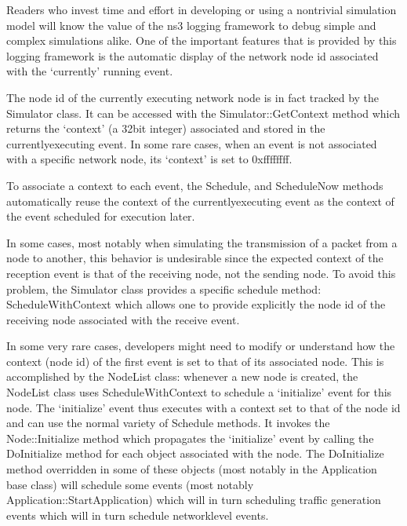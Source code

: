 \documentclass[letterpaper,10pt,english]{sphinxmanual}
\begin{document}
Readers who invest time and effort in developing or using a non\sphinxhyphen{}trivial
simulation model will know the value of the ns\sphinxhyphen{}3 logging framework to
debug simple and complex simulations alike. One of the important
features that is provided by this logging framework is the automatic
display of the network node id associated with the ‘currently’ running
event.

The node id of the currently executing network node is in fact tracked
by the Simulator class. It can be accessed with the
Simulator::GetContext method which returns the ‘context’ (a 32\sphinxhyphen{}bit
integer) associated and stored in the currently\sphinxhyphen{}executing event. In some
rare cases, when an event is not associated with a specific network
node, its ‘context’ is set to 0xffffffff.

To associate a context to each event, the Schedule, and ScheduleNow
methods automatically reuse the context of the currently\sphinxhyphen{}executing event
as the context of the event scheduled for execution later.

In some cases, most notably when simulating the transmission of a packet
from a node to another, this behavior is undesirable since the expected
context of the reception event is that of the receiving node, not the
sending node. To avoid this problem, the Simulator class provides a
specific schedule method: ScheduleWithContext which allows one to
provide explicitly the node id of the receiving node associated with
the receive event.


In some very rare cases, developers might need to modify or understand
how the context (node id) of the first event is set to that of its
associated node. This is accomplished by the NodeList class: whenever a
new node is created, the NodeList class uses ScheduleWithContext to
schedule a ‘initialize’ event for this node. The ‘initialize’ event thus executes
with a context set to that of the node id and can use the normal variety
of Schedule methods. It invokes the Node::Initialize method which propagates
the ‘initialize’ event by calling the DoInitialize method for each object
associated with the node. The DoInitialize method overridden in some of these
objects (most notably in the Application base class) will schedule some
events (most notably Application::StartApplication) which will in turn
scheduling traffic generation events which will in turn schedule
network\sphinxhyphen{}level events.
\end{document}
